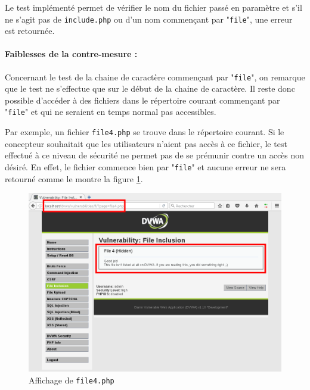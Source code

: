 Le test implémenté permet de vérifier le nom du fichier passé en paramètre et s'il ne s'agit pas de \texttt{include.php} ou d'un nom commençant par "\texttt{file}", une erreur est retournée.

\paragraph{Faiblesses de la contre-mesure :}

Concernant le test de la chaine de caractère commençant par "\texttt{file}", on remarque que le test ne s'effectue que sur le début de la chaine de caractère. Il reste donc possible d'accéder à des fichiers dans le répertoire courant commençant par "\texttt{file}" et qui ne seraient en temps normal pas accessibles. 

Par exemple, un fichier \texttt{file4.php} se trouve dans le répertoire courant. Si le concepteur souhaitait que les utilisateurs n'aient pas accès à ce fichier, le test effectué à ce niveau de sécurité ne permet pas de se prémunir contre un accès non désiré. En effet, le fichier commence bien par "\texttt{file}" et aucune erreur ne sera retourné comme le montre la figure \ref{fi_dvwa8}.

\begin{figure}[!h]
\begin{center}
\includegraphics[scale=.45]{images/fi8.png}

\caption{Affichage de \texttt{file4.php}}
\label{fi_dvwa8}
\end{center}
\end{figure}

